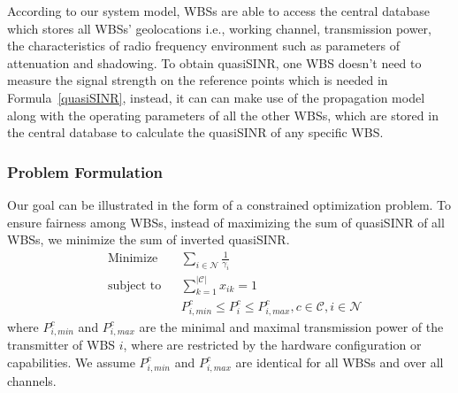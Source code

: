 \documentclass[times]{ettauth}
\newcommand{\ie}{i.e., }
\theoremstyle{mytheoremstyle}
\theoremstyle{mytheoremstyle}
\theoremstyle{mytheoremstyle}
\begin{document}
According to our system model, WBSs are able to access the central database which stores all WBSs' geolocations \ie working channel, transmission power, the characteristics of radio frequency environment such as parameters of attenuation and shadowing.
To obtain quasiSINR, one WBS doesn't need to measure the signal strength on the reference points which is needed in Formula~\ref{quasiSINR}, instead, it can can make use of the propagation model~\cite{Jaentti11} along with the operating parameters of all the other WBSs, which are stored in the central database to calculate the quasiSINR of any specific WBS.



\subsubsection*{Problem Formulation}
Our goal can be illustrated in the form of a constrained optimization problem.
To ensure fairness among WBSs, instead of maximizing the sum of quasiSINR of all WBSs, we minimize the sum of inverted quasiSINR. 
	\begin{equation}
\label{problem}
			\begin{aligned}
			& {\text{Minimize}}
			& & \sum_{i\in \mathcal{N}}\frac{1}{\gamma_{i}} \\
			& \text{subject to}
			& & \sum_{k=1}^{|\mathcal{C}|}x_{ik}=1 \\
			& & & P_{i,min}^c \leq P_i^c \leq P_{i,max}^c, c \in \mathcal{C}, i\in \mathcal{N}
			\end{aligned}
		\end{equation}
		where $P_{i,min}^c$ and $P_{i,max}^c$ are the minimal and maximal transmission power of the transmitter of WBS $i$, where are restricted by the hardware configuration or capabilities.
We assume $P_{i,min}^c$ and $P_{i,max}^c$ are identical for all WBSs and over all channels.
\end{document}
